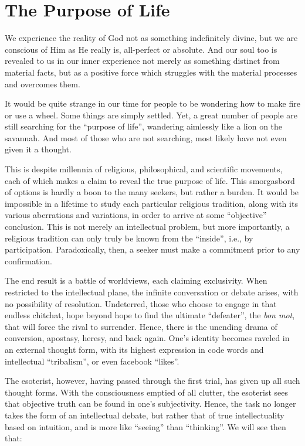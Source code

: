 \section{The Purpose of Life}

\begin{quotex}
We experience the reality of God not as something indefinitely divine, but we are conscious of Him as He really is, all-perfect or absolute. And our soul too is revealed to us in our inner experience not merely as something distinct from material facts, but as a positive force which struggles with the material processes and overcomes them.
\end{quotex}


It would be quite strange in our time for people to be wondering how to make fire or use a wheel. Some things are simply settled. Yet, a great number of people are still searching for the ``purpose of life'', wandering aimlessly like a lion on the savannah. And most of those who are not searching, most likely have not even given it a thought.

This is despite millennia of religious, philosophical, and scientific movements, each of which makes a claim to reveal the true purpose of life. This smorgasbord of options is hardly a boon to the many seekers, but rather a burden. It would be impossible in a lifetime to study each particular religious tradition, along with its various aberrations and variations, in order to arrive at some ``objective'' conclusion. This is not merely an intellectual problem, but more importantly, a religious tradition can only truly be known from the ``inside'', i.e., by participation. Paradoxically, then, a seeker must make a commitment prior to any confirmation.

The end result is a battle of worldviews, each claiming exclusivity. When restricted to the intellectual plane, the infinite conversation or debate arises, with no possibility of resolution. Undeterred, those who choose to engage in that endless chitchat, hope beyond hope to find the ultimate ``defeater'', the \emph{bon mot}, that will force the rival to surrender. Hence, there is the unending drama of conversion, apostasy, heresy, and back again. One's identity becomes raveled in an external thought form, with its highest expression in code words and intellectual ``tribalism'', or even facebook ``likes''.

The esoterist, however, having passed through the first trial, has given up all such thought forms. With the consciousness emptied of all clutter, the esoterist sees that objective truth can be found in one's subjectivity. Hence, the task no longer takes the form of an intellectual debate, but rather that of true intellectuality based on intuition, and is more like ``seeing'' than ``thinking''. We will see then that:

